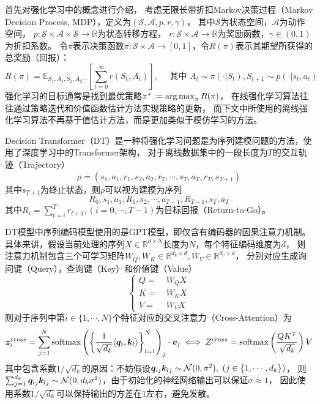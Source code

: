 首先对强化学习中的概念进行介绍，
考虑无限长带折扣Markov决策过程（Markov Decision Process, MDP），定义为$(\mathcal{S},\mathcal{A},p,r,\gamma)$，
其中$\mathcal{S}$为状态空间，$\mathcal{A}$为动作空间，
$p:\mathcal{S}\times \mathcal{A}\times \mathcal{S}\to \mathbb{R}$为状态转移方程，
$r:\mathcal{S}\times\mathcal{A}\to \mathbb{R}$为奖励函数，$\gamma\in(0,1)$为折扣系数。
令$\pi$表示决策函数$\pi: \mathcal{S}\times \mathcal{A}\to [0,1]$，令$R(\pi)$表示其期望所获得的总奖励（回报）：
\begin{equation}
  R(\pi) = \mathbb{E}_{S_1,A_1,S_2,A_2\cdots}\left[\sum_{t=0}^{\infty}r(S_t,A_t)\right],\quad
  \text{~其中~}A_t\sim\pi(\cdot|S_t),S_{t+1}\sim p(\cdot|s_t,a_t)
\end{equation}
强化学习的目标通常是找到最优策略$\pi^* := \operatorname*{arg\,max}_{\pi}R(\pi)$，
在线强化学习算法往往通过策略迭代和价值函数估计方法实现策略的更新，
而下文中所使用的离线强化学习算法不再基于值估计方法，而是更加类似于模仿学习的方法。

Decision Transformer（DT）是一种将强化学习问题是为序列建模问题的方法，使用了深度学习中的Transformer架构，
对于离线数据集中的一段长度为$T$的交互轨迹（Trajectory）
\begin{equation}
  \rho = (s_1,a_1,r_1,s_2,a_2,r_2,\cdots,s_T,a_T,r_T,s_{T+1})
\end{equation}
其中$s_{T+1}$为终止状态，则$\rho$可以视为建模为序列
\begin{equation}\label{eq-sequence}
  R_0,s_1,a_1,R_1,s_2,\cdots,a_{T-1},R_{T-1},s_{T},a_{T}
\end{equation}
其中$R_i=\sum_{t=i}^Tr_{t+1}, (i=0,\cdots,T-1)$为目标回报（Return-to-Go）。

DT模型中序列编码模型使用的是GPT模型，即仅含有编码器的因果注意力机制。
具体来讲，假设当前处理的序列$X\in\mathbb{R}^{d\times N}$长度为$N$，每个特征编码维度为$d$，
则注意力机制包含三个可学习矩阵$W_{Q},W_{K}\in\mathbb{R}^{d_k\times d}, W_{V}\in\mathbb{R}^{d_v\times d}$，
分别对应生成询问键（Query），查询键（Key）和价值键（Value）
\begin{equation}
  \left\{
  \begin{aligned}
  Q=&\ W_{Q}X\\ K=&\ W_{K}X\\ V=&\ W_{V}X
  \end{aligned}
  \right.
\end{equation}
则对于序列中第$i\in\{1,\cdots,N\}$个特征对应的交叉注意力（Cross-Attention）为
\begin{equation}
  \boldsymbol{z}^{cross}_i = \sum_{j=1}^N\text{softmax}\left(\left\{\frac{1}{\sqrt{d_k}}\langle \boldsymbol{q}_i,\boldsymbol{k}_l\rangle\right\}_{l=1}^N\right)_j\cdot \boldsymbol{v}_j\iff
  Z^{cross} = \text{softmax}\left(\frac{QK^T}{\sqrt{d_k}}\right)V
\end{equation}
其中包含系数$1/\sqrt{d_k}$的原因：不妨假设$\boldsymbol{q}_{ij}\boldsymbol{k}_{lj}\sim \mathcal{N}(0,\sigma^2),~(j\in\{1,\cdots,d_k\})$，
则$\sum_{j=1}^{d_k}\boldsymbol{q}_{ij}\boldsymbol{k}_{lj}\sim\mathcal{N}(0,d_k\sigma^2)$，由于初始化的神经网络输出可以保证$\sigma\approx 1$，
因此使用系数$1/\sqrt{d_k}$可以保持输出的方差在$1$左右，避免发散。

